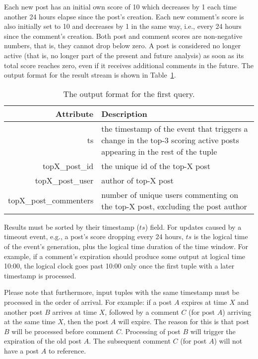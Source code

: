 \documentclass{sig-alternate}
\begin{document}
Each new post has an initial own score of 10 which decreases by 1 each time another 24 hours elapse since the post's creation. Each new comment's score is also initially set to 10 and decreases by 1 in the same way, i.e., every 24 hours since the comment's creation. Both post and comment scores are non-negative numbers, that is, they cannot drop below zero. A post is considered no longer active (that is, no longer part of the present and future analysis) as soon as its total score reaches zero, even if it receives additional comments in the future. The output format for the result stream is shown in Table~\ref{table:query1}. 

\begin{table}[ht]
	\caption{The output format for the first query.}
	\centering 
	\begin{tabular}{r p{4.4cm}}
		\toprule
		Attribute		&	 Description\\
		\midrule
		ts			&	the timestamp of the event that triggers a change in the top-3 scoring active posts appearing in the rest of the tuple\\[2ex]
		topX\_post\_id	&	the unique id of the top-X post\\[2ex]		
		topX\_post\_user	& 	 author of top-X post\\[2ex]		
		topX\_post\_commenters & number of unique users commenting on the top-X post, excluding the post author\\[2ex]
		\bottomrule 
	\end{tabular}
	\label{table:query1}
\end{table}

Results must be sorted by their timestamp ($ts$) field. For updates caused by a timeout event, e.g., a post's score dropping every 24 hours, $ts$ is the logical time of the event's generation, plus the logical time duration of the time window. For example, if a comment's expiration should produce some output at logical time 10:00, the logical clock goes past 10:00 only once the first tuple with a later timestamp is processed.

Please note that furthermore, input tuples with the same timestamp must be processed in the order of arrival. For example: if a post $A$ expires at time $X$ and another post $B$ arrives at time $X$, followed by a comment $C$ (for post $A$) arriving at the same time $X$, then the post $A$ will expire. The reason for this is that post $B$ will be processed before comment $C$. Processing of post $B$ will trigger the expiration of the old post $A$. The subsequent comment $C$ (for post $A$) will not have a post $A$ to reference.
\end{document}
